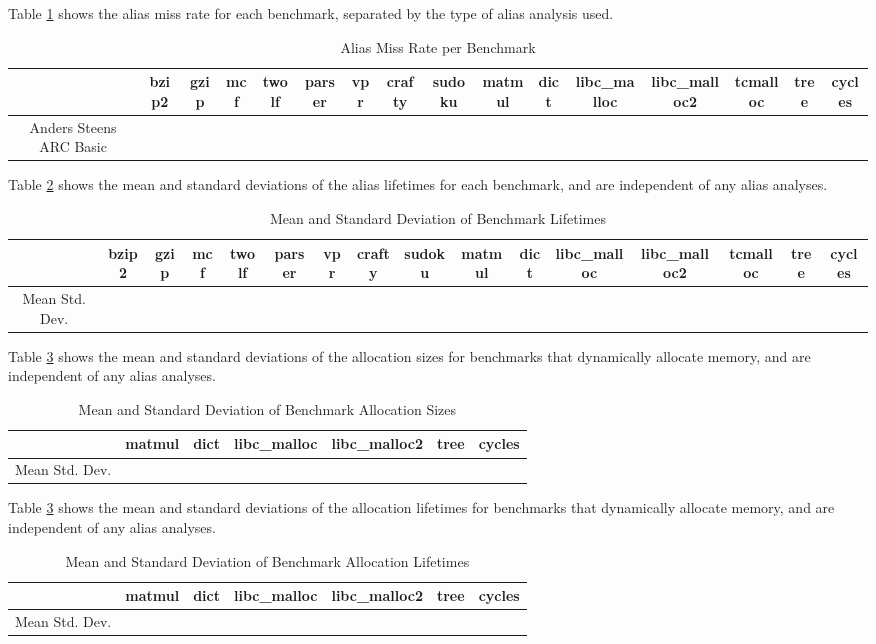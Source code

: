Table \ref{table:3} shows the alias miss rate for each benchmark, separated by the type of alias analysis used.

\begin{table}
\centering
   \begin{tabular} {|c|c c c c c c c c c c c c c c c|}
      \hline
      & bzip2 & gzip & mcf & twolf & parser & vpr & crafty & sudoku & matmul & dict & libc_malloc & libc_malloc2 & tcmalloc & tree & cycles \\
      \hline
      Anders
      \hline
      Steens
      \hline
      ARC
      \hline
      Basic
      \hline
   \end{tabular}
   \caption{Alias Miss Rate per Benchmark}
   \label{table:3}
\end{table}

Table \ref{table:4} shows the mean and standard deviations of the alias lifetimes for each benchmark, and are independent of any alias analyses.

\begin{table}
\centering
   \begin{tabular} {|c|c c c c c c c c c c c c c c c|}
      \hline
      & bzip2 & gzip & mcf & twolf & parser & vpr & crafty & sudoku & matmul & dict & libc_malloc & libc_malloc2 & tcmalloc & tree & cycles \\
      \hline
      Mean
      \hline
      Std. Dev.
      \hline
   \end{tabular}
   \caption{Mean and Standard Deviation of Benchmark Lifetimes}
   \label{table:4}
\end{table}

Table \ref{table:5} shows the mean and standard deviations of the allocation sizes for benchmarks that dynamically allocate memory, and are independent of any alias analyses.

\begin{table}
\centering
   \begin{tabular} {|c|c c c c c c|}
      \hline
      & matmul & dict & libc_malloc & libc_malloc2 & tree & cycles \\
      \hline
      Mean
      \hline
      Std. Dev.
      \hline
   \end{tabular}
   \caption{Mean and Standard Deviation of Benchmark Allocation Sizes}
   \label{table:5}
\end{table}

Table \ref{table:5} shows the mean and standard deviations of the allocation lifetimes for benchmarks that dynamically allocate memory, and are independent of any alias analyses.

\begin{table}
\centering
   \begin{tabular} {|c|c c c c c c|}
      \hline
      & matmul & dict & libc_malloc & libc_malloc2 & tree & cycles \\
      \hline
      Mean
      \hline
      Std. Dev.
      \hline
   \end{tabular}
   \caption{Mean and Standard Deviation of Benchmark Allocation Lifetimes}
   \label{table:6}
\end{table}
